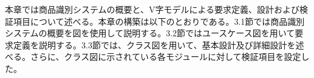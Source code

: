 本章では商品識別システムの概要と、V字モデルによる要求定義、設計および検証項目について述べる。本章の構築は以下のとおりである。3.1節では商品識別システムの概要を図を使用して説明する。3.2節ではユースケース図を用いて要求定義を説明する。3.3節では、クラス図を用いて、基本設計及び詳細設計を述べる。さらに、クラス図に示されている各モジュールに対して検証項目を設定した。

